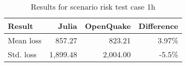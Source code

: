 \begin{table}[htbp]

\centering
\begin{tabular}{ l r r r }

\hline
\rowcolor{anti-flashwhite}
\bf{Result} & \bf{Julia} & \bf{OpenQuake} & \bf{Difference}\\
\hline
Mean loss & 857.27 & 823.21 & 3.97\% \\
Std. loss & 1,899.48 & 2,004.00 & -5.5\% \\
\hline
\end{tabular}

\caption{Results for scenario risk test case 1h}
\label{tab:result-sr-1h}
\end{table}

